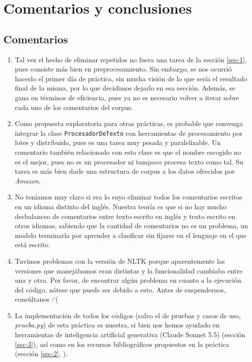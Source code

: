 \documentclass[10pt,a4paper]{article}
\begin{document}
\section{Comentarios y conclusiones}

\subsection{Comentarios}

\begin{enumerate}
    \item Tal vez el hecho de eliminar repetidos no fuera una tarea de la sección \ref{sec-1}, pues consiste más bien en 
    preprocesamiento. Sin embargo, se nos ocurrió hacerlo el primer día de práctica, sin mucha visión de lo que sería el 
    resultado final de la misma, por lo que decidimos dejarlo en esa sección. Además, se gana en términos de eficiencia, pues 
    ya no es necesario volver a iterar sobre cada uno de los comentarios del corpus. 
    \item Como propuesta exploratoria para otras prácticas, es probable que convenga integrar la clase \texttt{ProcesadorDeTexto}
    con herramientas de procesamiento por lotes y distribuido, pues es una tarea muy pesada y paralelizable. Un comentario 
    también relacionado con esta clase es que el nombre escogido no es el mejor, pues no es un procesador ni tampoco procesa texto
    como tal. Su tarea es más bien darle una estructura de corpus a los datos ofrecidos por \textit{Amazon}. 
    \item No teníamos muy claro si era lo suyo eliminar todos los comentarios escritos en un idioma distinto del inglés. 
    Nuestra teoría es que si no hay mucho desbalanceo de comentarios entre texto escrito en inglés y texto escrito en otros 
    idiomas, sabiendo que la cantidad de comentarios no es un problema, un modelo terminaría por aprender a clasificar sin
    fijarse en el lenguaje en el que está escrito. 
    \item Tuvimos problemas con la versión de NLTK porque aparentemente las versiones que manejábamos eran distintas y 
    la funcionalidad cambiaba entre una y otra. Por favor, de encontrar algún problema en cuanto a la ejecución del 
    código, nótese que puede ser debido a esto. Antes de suspendernos, consúltanos :`(
    \item La implementación de todos los códigos (salvo el de pruebas y casos de uso, \textit{prueba.py}) de esta práctica 
    es nuestra, si bien nos hemos ayudado en herramientas de inteligencia artificial generativa (Claude Sonnet 5.5)
    (sección \ref{sec-3}), así como en los recursos bibliográficos propuestos en la práctica (sección \ref{sec-2}, \cite{bengfort2018}). 
\end{enumerate}
\end{document}
